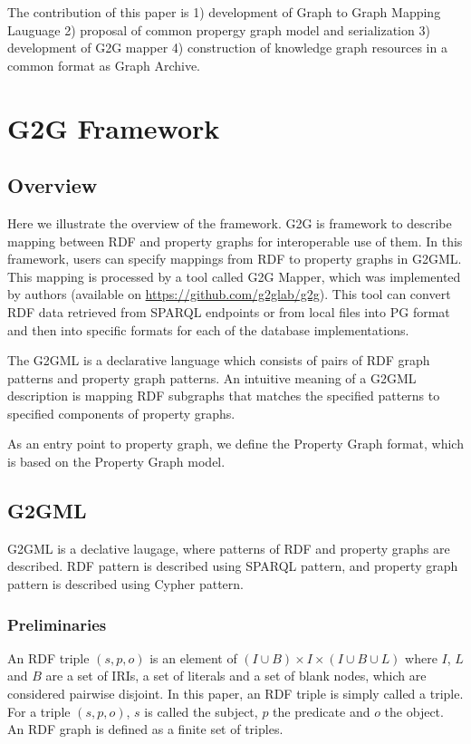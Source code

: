 \documentclass[runningheads]{llncs}
\begin{document}
The contribution of this paper is 1) development of Graph to Graph Mapping Lauguage 2) proposal of common propergy graph model and serialization 3) development of G2G mapper 4) construction of knowledge graph resources in a common format as Graph Archive.


\section{G2G Framework}

\subsection{Overview}

Here we illustrate the overview of the framework.
G2G is framework to describe mapping between RDF and property graphs for interoperable use of them. In this framework, users can specify mappings from RDF to property graphs in G2GML.
This mapping is processed by a tool called G2G Mapper, which was implemented by authors (available on \url{https://github.com/g2glab/g2g}). This tool can convert RDF data retrieved from SPARQL endpoints or from local files into PG format and then into specific formats for each of the database implementations.

The G2GML is a declarative language which consists of pairs of RDF graph patterns and property graph patterns. 
An intuitive meaning of a G2GML description is mapping RDF subgraphs that matches the specified patterns to specified components of property graphs.

As an entry point to property graph, we define the Property Graph format, which is based on the Property Graph model.



\subsection{G2GML}

G2GML is a declative laugage, where patterns of RDF and property graphs are described. RDF pattern is described using SPARQL pattern, and property graph pattern is described using Cypher pattern.

\subsubsection{Preliminaries}

An RDF triple $(s, p, o)$ is an element of $(I \cup B) \times I \times (I \cup B \cup L)$ where $I$, $L$ and $B$ are a set of IRIs, a set of literals and a set of blank nodes, which are considered pairwise disjoint. In this paper, an RDF triple is simply called a triple. For a triple $(s, p, o)$, $s$ is called the subject, $p$ the predicate and $o$ the object. An RDF graph is defined as a finite set of triples.
\end{document}
